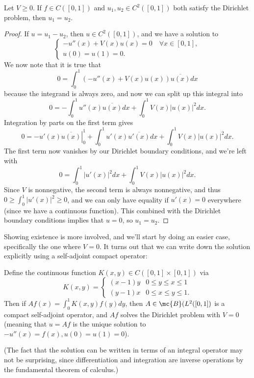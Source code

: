 \begin{theorem}\label{dirichletuniqueness}
Let $V \ge 0$. If $f \in C([0, 1])$ and $u_1, u_2 \in C^2([0, 1])$ both satisfy the Dirichlet problem, then $u_1 = u_2$.
\end{theorem}
\begin{proof}
If $u = u_1 - u_2$, then $u \in C^2([0, 1])$, and we have a solution to
\[
    \begin{cases} -u''(x) + V(x) u(x) = 0 \quad \forall x \in [0, 1], \\ u(0) = u(1) = 0. \end{cases}
\]
We now note that it is true that
\[
    0 = \int_0^1 \left(-u''(x) + V(x) u(x)\right) \overline{u(x)} dx
\]
because the integrand is always zero, and now we can split up this integral into 
\[
    0 = -\int_0^1 u''(x) \overline{u(x)} dx + \int_0^1 V(x) |u(x)|^2 dx.
\]
Integration by parts on the first term gives 
\[
    0 = \left.-u'(x) \overline{u(x)}\right|^1_0 + \int_0^1 u'(x) \overline{u'(x)} dx + \int_0^1 V(x) |u(x)|^2 dx.
\]
The first term now vanishes by our Dirichlet boundary conditions, and we're left with 
\[
    0 = \int_0^1 |u'(x)|^2 dx + \int_0^1 V(x) |u(x)|^2 dx.
\]
Since $V$ is nonnegative, the second term is always nonnegative, and thus $0 \ge \int_0^1 |u'(x)|^2 \ge 0$, and we can only have equality if $u'(x) = 0$ everywhere (since we have a continuous function). This combined with the Dirichlet boundary conditions implies that $u = 0$, so $u_1 = u_2$.
\end{proof}

Showing existence is more involved, and we'll start by doing an easier case, specifically the one where $V = 0$. It turns out that we can write down the solution explicitly using a self-adjoint compact operator:

\begin{theorem}
Define the continuous function $K(x, y) \in C([0, 1] \times [0, 1])$ via
\[
    K(x, y) = \begin{cases} (x-1)y & 0 \le y \le x \le 1 \\ (y-1)x & 0 \le x \le y \le 1. \end{cases}
\]
Then if $Af(x) = \int_0^1 K(x, y) f(y) dy$, then $A \in \mc{B}(L^2([0, 1])$ is a compact self-adjoint operator, and $Af$ solves the Dirichlet problem with $V = 0$ (meaning that $u = Af$ is the unique solution to $-u''(x) = f(x), u(0) = u(1) = 0$). 
\end{theorem}

(The fact that the solution can be written in terms of an integral operator may not be surprising, since differentiation and integration are inverse operations by the fundamental theorem of calculus.)

